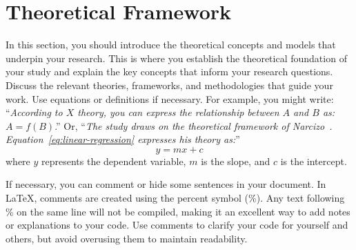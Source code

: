 \section{Theoretical Framework}\label{sec:theoretical-framework}
In this section, you should introduce the theoretical concepts and models that underpin your research. This is where you establish the theoretical foundation of your study and explain the key concepts that inform your research questions. Discuss the relevant theories, frameworks, and methodologies that guide your work. Use equations or definitions if necessary. For example, you might write: ``\textit{According to $X$ theory, you can express the relationship between $A$ and $B$ as:} $A = f(B)$.'' Or, ``\textit{The study draws on the theoretical framework of Narcizo~\cite{Narcizo2012}. Equation~\ref{eq:linear-regression} expresses his theory as:}''
\begin{equation}
    y = mx + c
    \label{eq:linear-regression}
\end{equation}
where $y$ represents the dependent variable, $m$ is the slope, and $c$ is the intercept.

If necessary, you can comment or hide some sentences in your document. In \LaTeX, comments are created using the percent symbol (\%). Any text following \% on the same line will not be compiled, making it an excellent way to add notes or explanations to your code. Use comments to clarify your code for yourself and others, but avoid overusing them to maintain readability.

